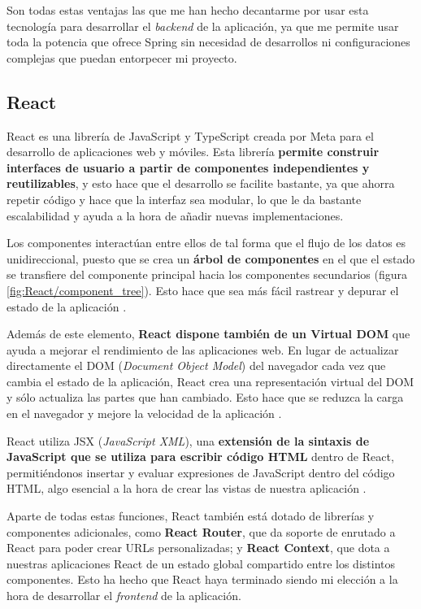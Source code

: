 Son todas estas ventajas las que me han hecho decantarme por usar esta tecnología para desarrollar el \textit{backend} de la aplicación, ya que me permite usar toda la potencia que ofrece Spring sin necesidad de desarrollos ni configuraciones complejas que puedan entorpecer mi proyecto.

\subsection{React}

React es una librería de JavaScript y TypeScript creada por Meta para el desarrollo de aplicaciones web y móviles. Esta librería \textbf{permite construir interfaces de usuario a partir de componentes independientes y reutilizables}, y esto hace que el desarrollo se facilite bastante, ya que ahorra repetir código y hace que la interfaz sea modular, lo que le da bastante escalabilidad y ayuda a la hora de añadir nuevas implementaciones.

Los componentes interactúan entre ellos de tal forma que el flujo de los datos es unidireccional, puesto que se crea un \textbf{árbol de componentes} en el que el estado se transfiere del componente principal hacia los componentes secundarios (figura \ref{fig:React/component_tree}). Esto hace que sea más fácil rastrear y depurar el estado de la aplicación \cite{kinsta:react}.


Además de este elemento, \textbf{React dispone también de un Virtual DOM} que ayuda a mejorar el rendimiento de las aplicaciones web. En lugar de actualizar directamente el DOM (\textit{Document Object Model}) del navegador cada vez que cambia el estado de la aplicación, React crea una representación virtual del DOM y sólo actualiza las partes que han cambiado. Esto hace que se reduzca la carga en el navegador y mejore la velocidad de la aplicación \cite{geeksforgeeks:virtual-dom}.


React utiliza JSX (\textit{JavaScript XML}), una \textbf{extensión de la sintaxis de JavaScript que se utiliza para escribir código HTML} dentro de React, permitiéndonos insertar y evaluar expresiones de JavaScript dentro del código HTML, algo esencial a la hora de crear las vistas de nuestra aplicación \cite{react-docs:jsx}.

Aparte de todas estas funciones, React también está dotado de librerías y componentes adicionales, como \textbf{React Router}, que da soporte de enrutado a React para poder crear URLs personalizadas; y \textbf{React Context}, que dota a nuestras aplicaciones React de un estado global compartido entre los distintos componentes. Esto ha hecho que React haya terminado siendo mi elección a la hora de desarrollar el \textit{frontend} de la aplicación.

